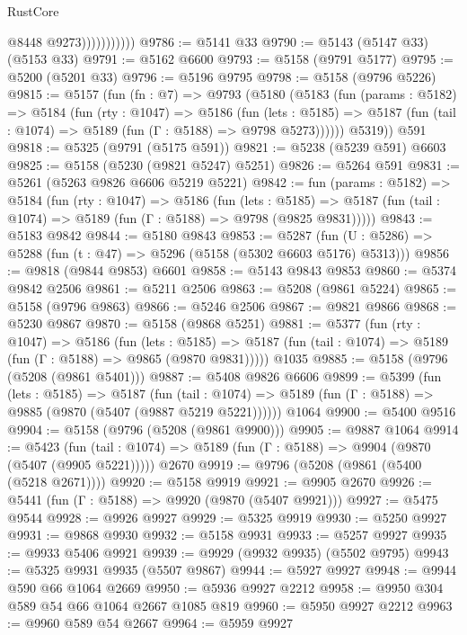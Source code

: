 \begin{lexlean}{RustCore}
\begin{coremodule}
                          @8448
                          @9273)))))))))))
@9786 := @5141 @33
@9790 := @5143 (@5147 @33) (@5153 @33)
@9791 := @5162 @6600
@9793 := @5158 (@9791 @5177)
@9795 := @5200 (@5201 @33)
@9796 := @5196 @9795
@9798 := @5158 (@9796 @5226)
@9815 := @5157
    (fun (fn : @7) =>
    @9793
      (@5180
        (@5183
          (fun (params : @5182) =>
          @5184
            (fun (rty : @1047) =>
            @5186
              (fun (lets : @5185) =>
              @5187 (fun (tail : @1074) => @5189 (fun (Γ : @5188) => @9798 @5273))))))
        @5319))
    @591
@9818 := @5325 (@9791 (@5175 @591))
@9821 := @5238 (@5239 @591) @6603
@9825 := @5158 (@5230 (@9821 @5247) @5251)
@9826 := @5264 @591
@9831 := @5261 (@5263 @9826 @6606 @5219 @5221)
@9842 := fun (params : @5182) =>
  @5184
    (fun (rty : @1047) =>
    @5186
      (fun (lets : @5185) =>
      @5187 (fun (tail : @1074) => @5189 (fun (Γ : @5188) => @9798 (@9825 @9831)))))
@9843 := @5183 @9842
@9844 := @5180 @9843
@9853 := @5287 (fun (U : @5286) => @5288 (fun (t : @47) => @5296 (@5158 (@5302 @6603 @5176) @5313)))
@9856 := @9818 (@9844 @9853) @6601
@9858 := @5143 @9843 @9853
@9860 := @5374 @9842 @2506
@9861 := @5211 @2506
@9863 := @5208 (@9861 @5224)
@9865 := @5158 (@9796 @9863)
@9866 := @5246 @2506
@9867 := @9821 @9866
@9868 := @5230 @9867
@9870 := @5158 (@9868 @5251)
@9881 := @5377
    (fun (rty : @1047) =>
    @5186
      (fun (lets : @5185) =>
      @5187 (fun (tail : @1074) => @5189 (fun (Γ : @5188) => @9865 (@9870 @9831)))))
    @1035
@9885 := @5158 (@9796 (@5208 (@9861 @5401)))
@9887 := @5408 @9826 @6606
@9899 := @5399
    (fun (lets : @5185) =>
    @5187
      (fun (tail : @1074) => @5189 (fun (Γ : @5188) => @9885 (@9870 (@5407 (@9887 @5219 @5221))))))
    @1064
@9900 := @5400 @9516
@9904 := @5158 (@9796 (@5208 (@9861 @9900)))
@9905 := @9887 @1064
@9914 := @5423
    (fun (tail : @1074) => @5189 (fun (Γ : @5188) => @9904 (@9870 (@5407 (@9905 @5221)))))
    @2670
@9919 := @9796 (@5208 (@9861 (@5400 (@5218 @2671))))
@9920 := @5158 @9919
@9921 := @9905 @2670
@9926 := @5441 (fun (Γ : @5188) => @9920 (@9870 (@5407 @9921)))
@9927 := @5475 @9544
@9928 := @9926 @9927
@9929 := @5325 @9919
@9930 := @5250 @9927
@9931 := @9868 @9930
@9932 := @5158 @9931
@9933 := @5257 @9927
@9935 := @9933 @5406 @9921
@9939 := @9929 (@9932 @9935) (@5502 @9795)
@9943 := @5325 @9931 @9935 (@5507 @9867)
@9944 := @5927 @9927
@9948 := @9944 @590 @66 @1064 @2669
@9950 := @5936 @9927 @2212
@9958 := @9950 @304 @589 @54 @66 @1064 @2667 @1085 @819
@9960 := @5950 @9927 @2212
@9963 := @9960 @589 @54 @2667
@9964 := @5959 @9927

\end{coremodule}
\end{lexlean}
